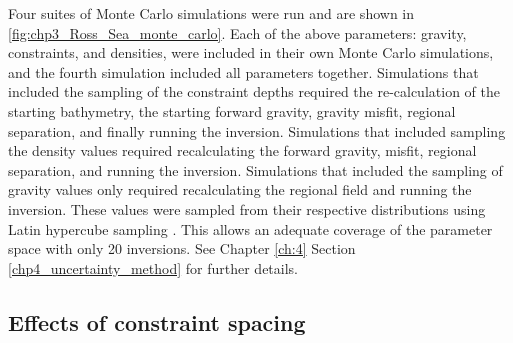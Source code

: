 
Four suites of Monte Carlo simulations were run and are shown in \ref{fig:chp3_Ross_Sea_monte_carlo}. Each of the above parameters: gravity, constraints, and densities, were included in their own Monte Carlo simulations, and the fourth simulation included all parameters together. Simulations that included the sampling of the constraint depths required the re-calculation of the starting bathymetry, the starting forward gravity, gravity misfit, regional separation, and finally running the inversion. Simulations that included sampling the density values required recalculating the forward gravity, misfit, regional separation, and running the inversion. Simulations that included the sampling of gravity values only required recalculating the regional field and running the inversion. These values were sampled from their respective distributions using Latin hypercube sampling \citep{jansenmonte1994}. This allows an adequate coverage of the parameter space with only 20 inversions. See Chapter \ref{ch:4} Section \ref{chp4_uncertainty_method} for further details.

\subsection{Effects of constraint spacing} \label{chp3:Ross_Sea_constraints_ensemble}

